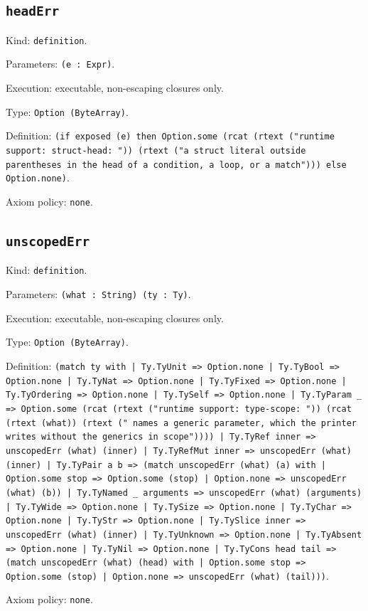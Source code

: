 \documentclass[11pt]{article}
\begin{document}
\subsection*{\texttt{headErr}}
\noindent Kind: \texttt{definition}.\par
\noindent Parameters: \texttt{(e : Expr)}.\par
\noindent Execution: executable, non-escaping closures only.\par
\noindent Type: \texttt{Option (ByteArray)}.\par
\noindent Definition: \texttt{(if exposed (e) then Option.some (rcat (rtext ("runtime support: struct-head: ")) (rtext ("a struct literal outside parentheses in the head of a condition, a loop, or a match"))) else Option.none)}.\par
\noindent Axiom policy: \texttt{none}.\par
\subsection*{\texttt{unscopedErr}}
\noindent Kind: \texttt{definition}.\par
\noindent Parameters: \texttt{(what : String) (ty : Ty)}.\par
\noindent Execution: executable, non-escaping closures only.\par
\noindent Type: \texttt{Option (ByteArray)}.\par
\noindent Definition: \texttt{(match ty with | Ty.TyUnit => Option.none | Ty.TyBool => Option.none | Ty.TyNat => Option.none | Ty.TyFixed => Option.none | Ty.TyOrdering => Option.none | Ty.TySelf => Option.none | Ty.TyParam \_ => Option.some (rcat (rtext ("runtime support: type-scope: ")) (rcat (rtext (what)) (rtext (" names a generic parameter, which the printer writes without the generics in scope")))) | Ty.TyRef inner => unscopedErr (what) (inner) | Ty.TyRefMut inner => unscopedErr (what) (inner) | Ty.TyPair a b => (match unscopedErr (what) (a) with | Option.some stop => Option.some (stop) | Option.none => unscopedErr (what) (b)) | Ty.TyNamed \_ arguments => unscopedErr (what) (arguments) | Ty.TyWide => Option.none | Ty.TySize => Option.none | Ty.TyChar => Option.none | Ty.TyStr => Option.none | Ty.TySlice inner => unscopedErr (what) (inner) | Ty.TyUnknown => Option.none | Ty.TyAbsent => Option.none | Ty.TyNil => Option.none | Ty.TyCons head tail => (match unscopedErr (what) (head) with | Option.some stop => Option.some (stop) | Option.none => unscopedErr (what) (tail)))}.\par
\noindent Axiom policy: \texttt{none}.\par
\end{document}
